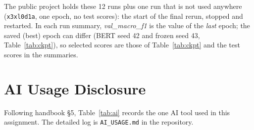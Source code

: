 \documentclass[11pt,a4paper]{article}
\begin{document}
The public project holds these 12 runs plus one run that is not used anywhere (\texttt{x3xl0d1a}, one epoch, no test scores): the start of the final rerun, stopped and restarted. In each run summary, \emph{val\_macro\_f1} is the value of the \emph{last} epoch; the saved (best) epoch can differ (BERT seed 42 and frozen seed 43, Table~\ref{tab:ckpt}), so selected scores are those of Table~\ref{tab:ckpt} and the test scores in the summaries.

\section{AI Usage Disclosure}
Following handbook \S5, Table~\ref{tab:ai} records the one AI tool used in this assignment. The detailed log is \texttt{AI\_USAGE.md} in the repository.
\end{document}
